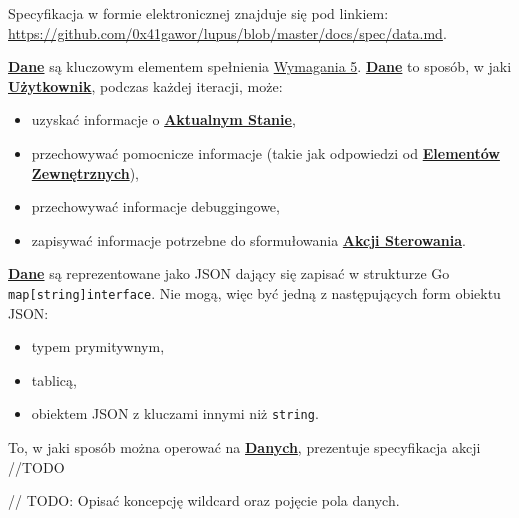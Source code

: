 \label{appendix:5}

Specyfikacja w formie elektronicznej znajduje się pod linkiem: \url{https://github.com/0x41gawor/lupus/blob/master/docs/spec/data.md}.

\hyperlink{def:dane}{\textbf{Dane}} są kluczowym elementem spełnienia \hyperref[req:5]{Wymagania 5}. \hyperlink{def:dane}{\textbf{Dane}} to sposób, w jaki \hyperlink{def:uzytkownik}{\textbf{Użytkownik}}, podczas każdej iteracji, może:
\begin{itemize}
    \item uzyskać informacje o \hyperlink{def:stan-aktualny}{\textbf{Aktualnym Stanie}},
    \item przechowywać pomocnicze informacje (takie jak odpowiedzi od \hyperlink{def:element-zewnetrzny}{\textbf{Elementów Zewnętrznych}}),
    \item przechowywać informacje debuggingowe,
    \item zapisywać informacje potrzebne do sformułowania \hyperlink{def:akcja-sterujaca}{\textbf{Akcji Sterowania}}.
\end{itemize}

\hyperlink{def:dane}{\textbf{Dane}} są reprezentowane jako JSON dający się zapisać w strukturze Go \texttt{map[string]interface{}}. Nie mogą, więc być jedną z następujących form obiektu JSON:
\begin{itemize}
    \item typem prymitywnym,
    \item tablicą,
    \item obiektem JSON z kluczami innymi niż \texttt{string}.
\end{itemize}

To, w jaki sposób można operować na \hyperlink{def:dane}{\textbf{Danych}}, prezentuje specyfikacja akcji //TODO

// TODO: Opisać koncepcję wildcard oraz pojęcie pola danych.
